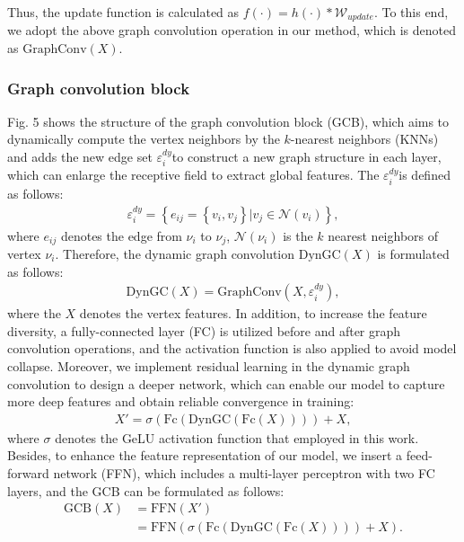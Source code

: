 \documentclass[journal]{IEEEtran}
\begin{document}
Thus, the update function is calculated as $f\left( \cdot  \right)=h\left( \cdot  \right)*{{\mathsf{\mathcal{W}}}_{update}}$. To this end, we adopt the above graph convolution operation in our method, which is denoted as $\text{GraphConv}\left( X \right)$.

\subsubsection{Graph convolution block}
Fig. 5 shows the structure of the graph convolution block (GCB), which aims to dynamically compute the vertex neighbors by the $k$-nearest neighbors (KNNs) and adds the new edge set $\varepsilon _{i}^{dy}$to construct a new graph structure in each layer, which can enlarge the receptive field to extract global features. The $\varepsilon _{i}^{dy}$is defined as follows:
\begin{equation}
\begin{split}
\varepsilon _{i}^{dy}=\left\{ {{e}_{ij}}=\left\{ {{v}_{i}},{{v}_{j}} \right\}|{{v}_{j}}\in \mathsf{\mathcal{N}}\left( {{v}_{i}} \right) \right\},
\end{split}
\end{equation}
where ${{e}_{ij}}$ denotes the edge from ${{\nu }_{i}}$ to ${{\nu }_{j}}$, $\mathcal{N}\left( {{\nu }_{i}} \right)$ is the $k$ nearest neighbors of vertex ${{\nu }_{i}}$. Therefore, the dynamic graph convolution $\text{DynGC}\left( X \right)$ is formulated as follows:
\begin{equation}
\begin{split}
\text{DynGC}\left( X \right)=\text{GraphConv}\left( X,\varepsilon _{i}^{dy} \right),
\end{split}
\end{equation}
where the $X$ denotes the vertex features. In addition, to increase the feature diversity, a fully-connected layer (FC) is utilized before and after graph convolution operations, and the activation function is also applied to avoid model collapse. Moreover, we implement residual learning in the dynamic graph convolution to design a deeper network, which can enable our model to capture more deep features and obtain reliable convergence in training:
\begin{equation}
\begin{split}
X'=\sigma \left( \text{Fc}\left( \text{DynGC}\left( \text{Fc}\left( X \right) \right) \right) \right)+X,
\end{split}
\end{equation}
where $\sigma $ denotes the GeLU activation function \cite{hendrycks2016gaussian} that employed in this work. Besides, to enhance the feature representation of our model, we insert a feed-forward network (FFN), which includes a multi-layer perceptron with two FC layers, and the GCB can be formulated as follows:
\begin{equation}
\begin{split}
\text{GCB}\left( X \right)&=\text{FFN}\left( X' \right) \\ 
 & =\text{FFN}\left( \sigma \left( \text{Fc}\left( \text{DynGC}\left( \text{Fc}\left( X \right) \right) \right) \right)+X \right).
\end{split}
\end{equation}
\end{document}
